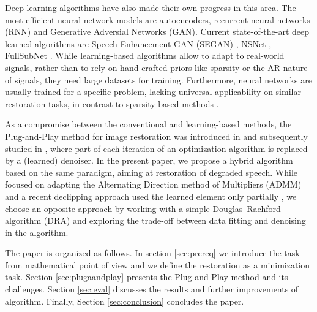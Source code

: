 \documentclass[conference]{IEEEtran}
\begin{document}
Deep learning algorithms have also made their own progress in this area.
The most efficient neural network models are autoencoders,
recurrent neural networks (RNN) and
Generative Adversial Networks (GAN).
Current state-of-the-art deep learned algorithms are Speech Enhancement GAN (SEGAN) \cite{Pascual2017}, NSNet \cite{Xia2020}, FullSubNet \cite{Hao2021}.
While learning-based algorithms allow to adapt to real-world signals, rather than to rely on hand-crafted priors like sparsity or the AR nature of signals, they need large datasets for training.
Furthermore, neural networks are usually trained for a specific problem, lacking universal applicability on similar restoration tasks, in contrast to sparsity-based methods \cite{Gaultier2017, Mokry202021, Zaviska2021}.

As a compromise between the conventional and learning-based methods, 
the Plug-and-Play method for image restoration was introduced in \cite{Venkatakrishnan2013} and subsequently studied in \cite{Chan2016},
where part of each iteration of an optimization algorithm is replaced by a (learned) denoiser.
In the present paper, we propose a hybrid algorithm based on the same paradigm, aiming at restoration of degraded speech.
While \cite{Chan2016} focused on adapting the Alternating Direction method of Multipliers (ADMM) and a recent declipping approach used the learned element only partially \cite{Tanaka2022}, we choose an opposite approach by working with a simple Douglas--Rachford algorithm (DRA) and exploring the trade-off between data fitting and denoising in the algorithm.



The paper is organized as follows. In section \ref{sec:prereq} we introduce the task from mathematical point of view and we define the restoration as a minimization task.
Section \ref{sec:plugaandplay} presents the Plug-and-Play method and its challenges.
Section \ref{sec:eval} discusses the results and further improvements of algorithm.
Finally, Section \ref{sec:conclusion} concludes the paper.
\end{document}
